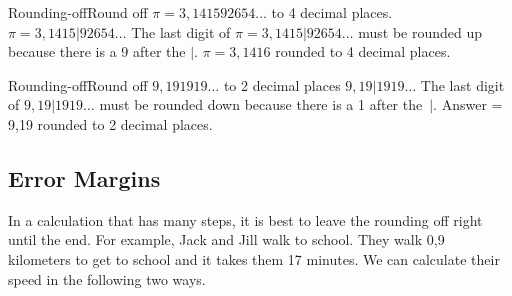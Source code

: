 \pagebreak[4]
\begin{wex}{Rounding-off}{Round off $\pi=3,141592654\ldots$ to 4 decimal places.}
{
$\pi=3,1415|92654\ldots$
The last digit of $\pi=3,1415|92654\ldots$ must be rounded up because there is a 9 after the $|$.
$\pi=3,1416$ rounded to 4 decimal places.}
\end{wex}

\begin{wex}{Rounding-off}{Round off $9,191919\ldots$ to 2 decimal places}
{
$9,19|1919\ldots$
The last digit of $9,19|1919\dots$ must be rounded down because there is a 1 after the~$|$.
Answer = 9,19 rounded to 2 decimal places.}
\end{wex}

\subsection{Error Margins}
In a calculation that has many steps, it is best to leave the rounding off right until the end.
For example, Jack and Jill walk to school. They walk 0,9 kilometers to get to school and it takes them 17 minutes. We can calculate their speed in the following two ways. 

